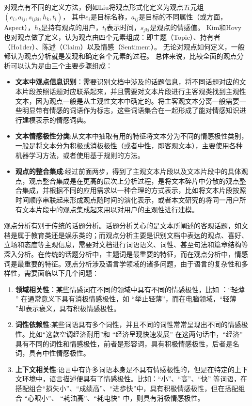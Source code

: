 对观点有不同的定义方法，例如Liu将观点形式化定义为观点五元组$ (e_i,a_{ij},s_{ijkl},h_k,t_l)$，
其中$ e_i $是目标名称，$ a_{ij} $是目标的不同属性（或方面，Aspect），$ h_k$是持有观点的用户，$ t_l$表示时间，$ s_{jkl}$是观点的情感值。
Kim和Hovy也对观点做了定义，认为观点由四个元素组成：即主题（Topic）、持有者（Ho1der）、陈述（Claim）以及情感（Sentiment）。
无论对观点如何定义，一般都认为观点分析就是发现和确定各个元素的过程。
总体来说，比较全面的观点分析可以认为是由三个主要步骤组成：
\begin{itemize}
\item \textbf{文本中观点信息识别}：需要识别文档中涉及的话题信息，将不同话题对应的文本片段按照话题对应联系起来，并且需要对文本片段进行主客观类找到主观性文本，因为观点一般是从主观性文本中确定的。将主客观文本分离一般需要一些明显带有情感的词语作为标志，这些词语集合在一起形成了能对情感知识进行建模表示的情感词典。
\item \textbf{文本情感极性分类}:从文本中抽取有用的特征将文本分为不同的情感极性类别，一般是将文本分为积极或消极极性（或者中性，即客观文本），主要使用各种机器学习方法，或者使用基于规则的方法。
\item \textbf{观点的整合集成}:经过前面两步，得到了主观文本片段以及文本片段中的具体观点，观点整合集成是在更高的层次上分析过程，是将文本碎片中分散的观点整合集成，并根据不同的应用需求以一种合理的方式表示，比如将文本片段按照时间顺序串联起来形成观点随时间的演化表示，或者本文研究的将同一用户所有文本片段中的观点集成起来用以对用户的主观性进行建模。
\end{itemize}

观点分析有别于传统的话题分析。话题分析关心的是文本所阐述的客观话题，如文档是属于教育类还是娱乐类的；而观点分析主要是识别文档中表达的观点、喜好、立场和态度等主观信息，需要对文档进行词语语义、词性、甚至句法和篇章结构等深入分析。在传统的话题分析中，主题词是最重要的特征，而在观点分析中，情感词是最重要的特征。观点分析涉及语言学领域的诸多问题，由于语言的复杂性和多样性，需要面临以下几个问题：

\begin{enumerate}
\item \textbf{领域相关性}：某些情感词在不同的领域中具有不同的情感极性，比如 ：``轻薄 '' 在通常意义下具有消极情感极性，如 ``举止轻薄''，而在电脑领域，``轻薄 ''却表示褒义，具有积极情感极性。
\item \textbf{词性依赖性}:某些词语具有多个词性，并且不同的词性常常呈现出不同的情感极性。比如``这款空调经济耐用''和 ``经济呈现快速发展'' 在这两句话中，``经济'' 具有不同的词性和情感极性，前者是形容词，具有积极情感极性，后者是名词，具有中性情感极性。
\item \textbf{上下文相关性}:语言中有许多词语本身是不具有情感极性的，但是在特定的上下文环境中，语言描述便具有了情感极性。比如：``小''、``高''、``快'' 等词语，在搭配组合``损失小''、``成绩高''、``进歩快''中，具有积极情感极性，但在搭配组合 ``心眼小''、 ``耗油高''、``耗电快'' 中，则具有消极情感极性。
\end{enumerate}

